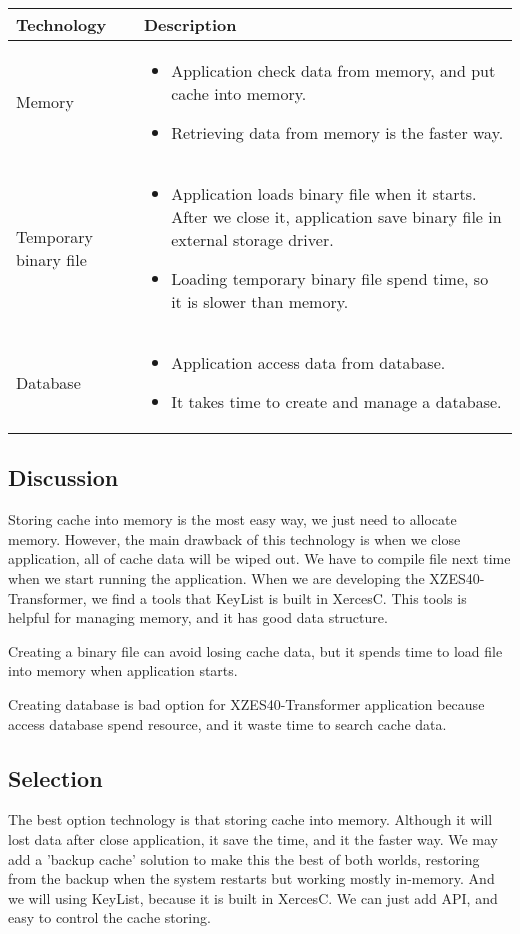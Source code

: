 \begin{center}
    \begin{tabular}{ | l | p{10cm} |}
    \hline
    Technology & Description  \\ \hline
    Memory&
    \begin{itemize}
      \item Application check data from memory, and put cache into memory.
      \item Retrieving data from memory is the faster way.
    \end{itemize}\\ \hline
    Temporary binary file&
    \begin{itemize}
      \item Application loads binary file when it starts. After we close it, application save binary file in external storage driver.
      \item Loading temporary binary file spend time, so it is slower than memory.
    \end{itemize}\\ \hline
    Database &
    \begin{itemize}
      \item Application access data from database.
      \item It takes time to create and manage a database.
    \end{itemize}\\ \hline
    \end{tabular}
\end{center}

\subsection{Discussion}

Storing cache into memory is the most easy way, we just need to allocate memory.
However, the main drawback of this technology is when we close application, all of cache data will be wiped out.
We have to compile file next time when we start running the application.
When we are developing the XZES40-Transformer, we find a tools that KeyList is built in XercesC.
This tools is helpful for managing memory, and it has good data structure.

Creating a binary file can avoid losing cache data, but it spends time to load file into memory when application starts.

Creating database is bad option for XZES40-Transformer application because access database spend resource, and it waste time to search cache data.

\subsection{Selection}

The best option technology is that storing cache into memory.
Although it will lost data after close application, it save the time, and it the faster way.
We may add a 'backup cache' solution to make this the best of both worlds, restoring from the backup when the system restarts but working mostly in-memory.
And we will using KeyList, because it is built in XercesC.
We can just add API, and easy to control the cache storing.